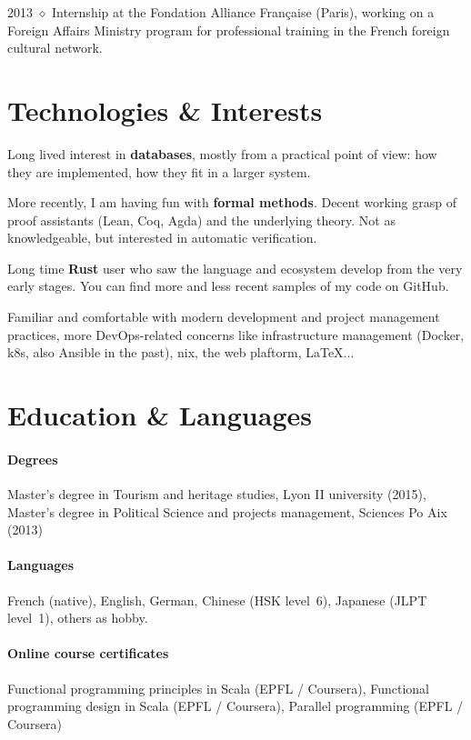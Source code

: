 \documentclass[10pt]{article}
\newcommand{\setparskip}{\setlength{\parskip}{.3em}}
\begin{document}
\hfill
\begin{minipage}[t]{0.42\textwidth}
  \setparskip

  2013 $\diamond$ Internship at the Fondation Alliance Française (Paris), working on a
  Foreign Affairs Ministry program for professional training in the French
  foreign cultural network.

  \section*{Technologies \& Interests}

  Long lived interest in \textbf{databases}, mostly from a practical point of
  view: how they are implemented, how they fit in a larger system.

  More recently, I am having fun with \textbf{formal methods}. Decent working
  grasp of proof assistants (Lean, Coq, Agda) and the underlying theory.  Not
  as knowledgeable, but interested in automatic verification.

  Long time \textbf{Rust} user who saw the language and ecosystem develop
  from the very early stages. You can find more and less recent samples of my
  code on GitHub.

  Familiar and comfortable with modern development and project management
  practices, more DevOps-related concerns like infrastructure management
  (Docker, k8s, also Ansible in the past), nix, the web plaftorm, \LaTeX...

  \section*{Education \& Languages}

  \paragraph{Degrees} Master's degree in Tourism and heritage studies, Lyon II university (2015), Master's degree in Political Science and projects management, Sciences Po Aix (2013)

  \vspace{-1em}

  \paragraph{Languages} French (native), English, German, Chinese (HSK level~6), Japanese (JLPT level~1), others as hobby.

  \vspace{-1em}

  \paragraph{Online course certificates} Functional programming principles in Scala (EPFL / Coursera), Functional programming design in Scala (EPFL / Coursera), Parallel programming (EPFL / Coursera)

\end{minipage}
\end{document}
